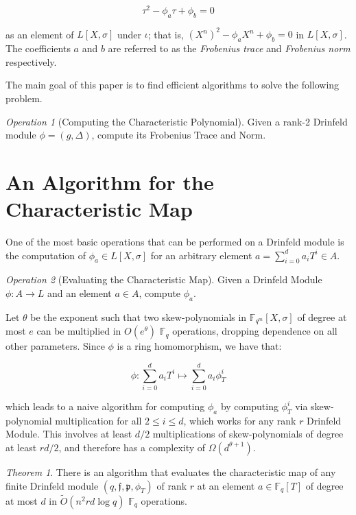 \documentclass{acmart}
\theoremstyle{remark}
\numberwithin{equation}{section}
\newtheorem{theorem}{Theorem}
\newtheorem{operation}{Operation}
\newcommand{\frakf}{\mathfrak{f}}
\begin{document}
\begin{equation} \tau^2 - \phi_a \tau + \phi_b = 0 \end{equation}

\noindent as an element of $L[X,\sigma]$ under $\iota$; that is, $(X^n)^2 - \phi_a X^n + \phi_b = 0$ in $L[X,\sigma]$. The coefficients $a$ and $b$ are referred to as the \textit{Frobenius trace} and \textit{Frobenius norm} respectively. 

The main goal of this paper is to find efficient algorithms to solve the following problem.

\begin{operation}[Computing the Characteristic Polynomial]
Given a rank-2 Drinfeld module $\phi = (g,\Delta)$, compute its Frobenius Trace and Norm.
\end{operation}

\section{An Algorithm for the Characteristic Map}

One of the most basic operations that can be performed on a Drinfeld module is the computation of $\phi_a \in L[X,\sigma]$ for an arbitrary element $a = \sum_{i=0}^d a_i T^i \in A$.

\begin{operation}[Evaluating the Characteristic Map]
Given a Drinfeld Module $\phi: A \to L$ and an element $a \in A$, compute $\phi_a$. 
\end{operation}

Let $\theta$ be the exponent such that two skew-polynomials in $\mathbb{F}_{q^m}[X,\sigma]$ of degree at most $e$ can be multiplied in $O(e^{\theta})$ $\mathbb{F}_q$ operations, dropping dependence on all other parameters. Since $\phi$ is a ring homomorphism, we have that:

\[ \phi : \sum_{i = 0}^d a_iT^i \mapsto \sum_{i = 0}^d a_i\phi_T^i \]

\noindent which leads to a naive algorithm for computing $\phi_a$ by computing $\phi_T^i$ via skew-polynomial multiplication for all $2 \leq i \leq d$, which works for any rank $r$ Drinfeld Module. This involves at least $d/2$ multiplications of skew-polynomials of degree at least $rd/2$, and therefore has a complexity of $\Omega(d^{\theta + 1})$. 

\begin{theorem}
There is an algorithm that evaluates the characteristic map of any finite Drinfeld module $(q,\frakf,\mathfrak{p}, \phi_T)$ of rank $r$ at an element $a \in \mathbb{F}_q[T]$ of degree at most $d$ in $\widetilde{O}(n^{2} rd \log q)$ $\mathbb{F}_q$ operations.
\end{theorem}
\end{document}
